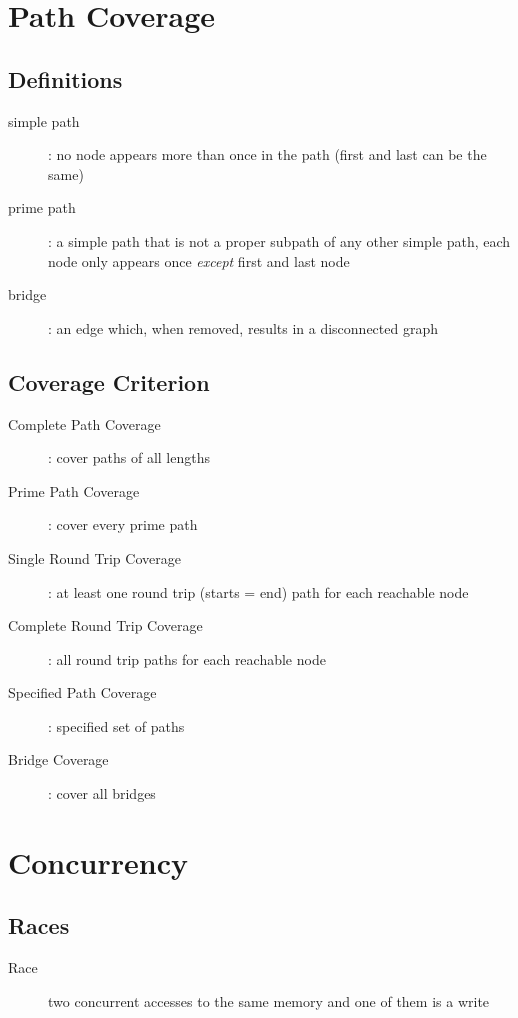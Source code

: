 \documentclass[]{article}
\theoremstyle{definition}
\begin{document}
	\section{Path Coverage}
		\subsection{Definitions}
			\begin{description}
				\item[simple path]: no node appears more than once in the path (first and last can be the same)
				\item[prime path]: a simple path that is not a proper subpath of any other simple path, each node only appears once \textit{except} first and last node
				\item[bridge]: an edge which, when removed, results in a disconnected graph
			\end{description}
			
		\subsection{Coverage Criterion}
			\begin{description}
				\item[Complete Path Coverage]: cover paths of all lengths
				\item[Prime Path Coverage]: cover every prime path
				\item[Single Round Trip Coverage]: at least one round trip (starts = end) path for each reachable node
				\item[Complete Round Trip Coverage]: all round trip paths for each reachable node
				\item[Specified Path Coverage]: specified set of paths
				\item[Bridge Coverage]: cover all bridges
			\end{description}
	\section{Concurrency}
		\subsection{Races}
			\begin{description}
				\item[Race] two concurrent accesses to the same memory and one of them is a write
			\end{description}
			
\end{document}

